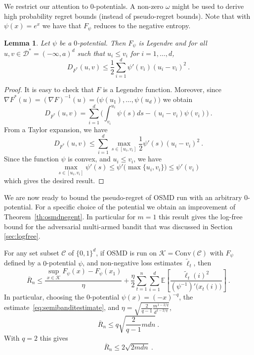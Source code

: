 \documentclass[11pt]{hackednow}
\newtheorem{lemma}{Lemma}[chapter]
\newcommand{\E}{\mathbb{E}}
\newcommand{\cC}{\mathcal{C}}
\newcommand{\cK}{\mathcal{K}}
\newcommand{\cD}{\mathcal{D}}
\newcommand{\oR}{\overline{R}}
\renewcommand{\tilde}{\widetilde}
\newcommand{\conv}{\mathrm{Conv}}
\begin{document}
We restrict our attention to $0$-potentials. A non-zero $\omega$ might be used to derive high probability regret bounds (instead of pseudo-regret bounds). Note that with $\psi(x)=e^x$ we have that $F_{\psi}$ reduces to the negative entropy.
\begin{lemma} \label{lem:psi}
Let $\psi$ be a $0$-potential. Then $F_{\psi}$ is Legendre
and for all $u,v \in \cD^*=(-\infty,a)^d$ such that $u_i \leq v_i$ for $i=1,\hdots,d$,
$$D_{F^*}(u,v) \leq \frac{1}{2} \sum_{i=1}^d \psi'(v_i) (u_i - v_i)^2~.$$
\end{lemma}
\begin{proof}
It is easy to check that $F$ is a Legendre function. Moreover, since
	$
  \nabla F^*(u)= (\nabla F)^{-1}(u)= \big(\psi(u_1),\dots,\psi(u_d)\big)
	$
we obtain
	$$
  D_{F^*}(u,v)=\sum_{i=1}^d \bigg(\int_{v_i}^{u_i} \psi(s)ds-(u_i-v_i)\psi(v_i)\bigg)~.
  $$
From a Taylor expansion, we have
	$$
	D_{F^*}(u,v)\le\sum_{i=1}^d \max_{s\in[u_i,v_i]} \frac12 \psi'(s) (u_i-v_i)^2~.
	$$
Since the function $\psi$ is convex, and $u_i \leq v_i$, we have
	$$
	\max_{s\in[u_i,v_i]} \psi'(s) \le \psi'\big(\max\{u_i,v_i\}\big) \leq \psi'(v_i)
	$$
which gives the desired result.
\end{proof}
We are now ready to bound the pseudo-regret of OSMD run with an arbitrary $0$-potential. For a specific choice of the potential we obtain an improvement of Theorem~\ref{th:osmdnegent}. In particular for $m=1$ this result gives the log-free bound for the adversarial multi-armed bandit that was discussed in Section \ref{sec:logfree}.
\begin{theorem} \label{th:osmdzero}
For any set subset $\cC$ of $\{0,1\}^d$, if OSMD is run on $\cK=\conv(\cC)$ with $F_{\psi}$ defined by a $0$-potential $\psi$, and non-negative loss estimates $\tilde{\ell}_t$, then
$$\oR_n \leq \frac{\sup_{x \in \cK} F_{\psi}(x) - F_{\psi}(x_1)}{\eta} + \frac{\eta}{2} \sum_{t=1}^n \sum_{i=1}^d \E\left[\frac{\tilde{\ell}_t(i)^2}{(\psi^{-1})'\bigl(x_t(i)\bigr)}\right]~.$$
In particular, choosing the $0$-potential $\psi(x) = (- x)^{-q}$, the estimate~\eqref{eq:semibanditestimate}, and $\eta= \sqrt{\frac{2}{q-1} \frac{m^{1 - 2/q}}{d^{1 - 2/q}}}$,
$$\oR_n \leq q \sqrt{\frac{2}{q-1} m d n}~.$$
With $q=2$ this gives
$$\oR_n \leq 2 \sqrt{2 m d n}~.$$ 
\end{theorem}
\end{document}
